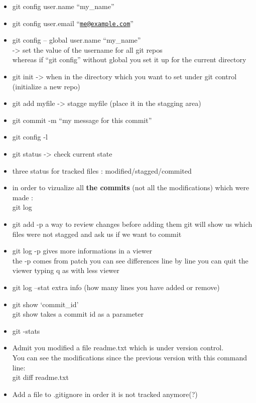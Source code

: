 \documentclass[
]{book}
\begin{document}
\begin{itemize}
\item
  git config user.name ``my\_name''
\item
  git config user.email ``\href{mailto:me@example.com}{\nolinkurl{me@example.com}}''
\item
  git config -- global user.name ``my\_name''\\
  -\textgreater{} set the value of the username for all git repos\\
  whereas if ``git config'' without global you set it up for the current directory
\item
  git init -\textgreater{} when in the directory which you want to set under git control (initialize a new repo)
\item
  git add myfile -\textgreater{} stagge myfile (place it in the stagging area)
\item
  git commit -m ``my message for this commit''
\item
  git config -l
\item
  git status -\textgreater{} check current state
\item
  three status for tracked files : modified/stagged/commited
\item
  in order to vizualize all \textbf{the commits} (not all the modifications) which were made :\\
  git log
\item
  git add -p
  a way to review changes before adding them
  git will show us which files were not stagged and ask us if we want to commit
\item
  git log -p gives more informations in a viewer\\
  the -p comes from patch
  you can see differences line by line
  you can quit the viewer typing q as with less viewer
\item
  git log --stat
  extra info (how many lines you have added or remove)
\item
  git show `commit\_id'\\
  git show takes a commit id as a parameter
\item
  git -stats
\item
  Admit you modified a file readme.txt which is under version control.\\
  You can see the modifications since the previous version with this command line:\\
  git diff readme.txt
\item
  Add a file to .gitignore in order it is not tracked anymore(?)

\end{itemize}
\end{document}
